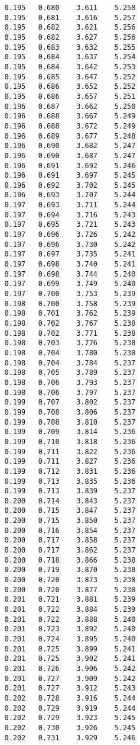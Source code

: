 \begin{verbatim}
   0.195   0.680    3.611    5.258
   0.195   0.681    3.616    5.257
   0.195   0.682    3.621    5.256
   0.195   0.682    3.627    5.256
   0.195   0.683    3.632    5.255
   0.195   0.684    3.637    5.254
   0.195   0.684    3.642    5.253
   0.195   0.685    3.647    5.252
   0.195   0.686    3.652    5.252
   0.195   0.686    3.657    5.251
   0.196   0.687    3.662    5.250
   0.196   0.688    3.667    5.249
   0.196   0.688    3.672    5.249
   0.196   0.689    3.677    5.248
   0.196   0.690    3.682    5.247
   0.196   0.690    3.687    5.247
   0.196   0.691    3.692    5.246
   0.196   0.691    3.697    5.245
   0.196   0.692    3.702    5.245
   0.196   0.693    3.707    5.244
   0.197   0.693    3.711    5.244
   0.197   0.694    3.716    5.243
   0.197   0.695    3.721    5.243
   0.197   0.696    3.726    5.242
   0.197   0.696    3.730    5.242
   0.197   0.697    3.735    5.241
   0.197   0.698    3.740    5.241
   0.197   0.698    3.744    5.240
   0.197   0.699    3.749    5.240
   0.197   0.700    3.753    5.239
   0.198   0.700    3.758    5.239
   0.198   0.701    3.762    5.239
   0.198   0.702    3.767    5.238
   0.198   0.702    3.771    5.238
   0.198   0.703    3.776    5.238
   0.198   0.704    3.780    5.238
   0.198   0.704    3.784    5.237
   0.198   0.705    3.789    5.237
   0.198   0.706    3.793    5.237
   0.198   0.706    3.797    5.237
   0.199   0.707    3.802    5.237
   0.199   0.708    3.806    5.237
   0.199   0.708    3.810    5.237
   0.199   0.709    3.814    5.236
   0.199   0.710    3.818    5.236
   0.199   0.711    3.822    5.236
   0.199   0.711    3.827    5.236
   0.199   0.712    3.831    5.236
   0.199   0.713    3.835    5.236
   0.199   0.713    3.839    5.237
   0.200   0.714    3.843    5.237
   0.200   0.715    3.847    5.237
   0.200   0.715    3.850    5.237
   0.200   0.716    3.854    5.237
   0.200   0.717    3.858    5.237
   0.200   0.717    3.862    5.237
   0.200   0.718    3.866    5.238
   0.200   0.719    3.870    5.238
   0.200   0.720    3.873    5.238
   0.200   0.720    3.877    5.238
   0.201   0.721    3.881    5.239
   0.201   0.722    3.884    5.239
   0.201   0.722    3.888    5.240
   0.201   0.723    3.892    5.240
   0.201   0.724    3.895    5.240
   0.201   0.725    3.899    5.241
   0.201   0.725    3.902    5.241
   0.201   0.726    3.906    5.242
   0.201   0.727    3.909    5.242
   0.201   0.727    3.912    5.243
   0.202   0.728    3.916    5.244
   0.202   0.729    3.919    5.244
   0.202   0.729    3.923    5.245
   0.202   0.730    3.926    5.245
   0.202   0.731    3.929    5.246

\end{verbatim}
